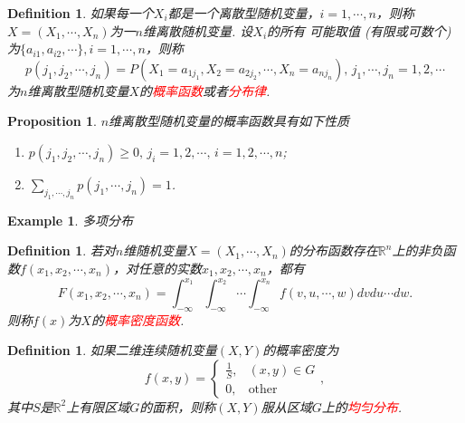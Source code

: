 \documentclass{article}
\newtheorem{proposition}[theorem]{Proposition}
\newtheorem{example}[theorem]{Example}
\newtheorem{definition}[theorem]{Definition}
\newcommand{\redt}[1]{\textcolor{red}{#1}}
\begin{document}
\begin{definition}
\rm 如果每一个$X_i$都是一个离散型随机变量，$i = 1,\cdots, n$，则称
$X = (X_1,\cdots, X_n)$为一$n$维离散随机变量. 设$X_i$的所有
可能取值 (有限或可数个) 为$\{a_{i1}, a_{i2}, \cdots \}, i = 1,\cdots, n$，则称
$$
p(j_1,j_2,\cdots,j_n) = P(X_1 = a_{1j_1}, X_2 = a_{2j_2},\cdots,X_n=a_{nj_n}),\, j_1,\cdots,j_n = 1,2,\cdots
$$
为$n$维离散型随机变量$X$的\redt{概率函数}或者\redt{分布律}. 
\end{definition}

\begin{proposition}
\rm $n$维离散型随机变量的概率函数具有如下性质
\begin{enumerate}
	\item $p(j_1,j_2,\cdots,j_n) \geq 0, \, j_i = 1,2,\cdots ,\, i=1,2,\cdots,n$;
	\item $\sum\limits_{j_1,\cdots,j_n} p(j_1,\cdots,j_n)=1$.
\end{enumerate}
\end{proposition}

\begin{example}
\rm 多项分布
\end{example}

\begin{definition}
\rm 若对$n$维随机变量$X = (X_1,\cdots, X_n)$的分布函数存在$\mathbb{R}^n$上的非负函数$f(x_1,x_2,\cdots,x_n)$，对任意的实数$x_1,x_2,\cdots,x_n$，都有
$$
F(x_1,x_2,\cdots,x_n) = \int_{-\infty}^{x_1}\int_{-\infty}^{x_2}\cdots\int_{-\infty}^{x_n}f(v,u,\cdots,w)dvdu\cdots dw.
$$
则称$f(x)$为$X$的\redt{概率密度函数}. 
\end{definition}

\begin{definition}
\rm  如果二维连续随机变量$(X,Y)$的概率密度为
$$
f(x,y) = \left\{\begin{array}{ll}
\frac{1}{S}, & (x,y) \in G\\
0, & \text{other}
\end{array}\right. ,
$$
其中$S$是$\mathbb{R}^2$上有限区域$G$的面积，则称$(X,Y)$服从区域$G$上的\redt{均匀分布}.
\end{definition}
\end{document}
